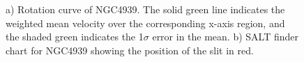 \begin{figure}[ht!]
\centering
  \caption{\small{a) Rotation curve of NGC4939. The solid green line indicates the weighted mean velocity over the corresponding x-axis region, and the shaded green indicates the 1$\sigma$ error in the mean. b) SALT finder chart for NGC4939 showing the position of the slit in red.}}
\vspace{0pt}
\end{figure}


